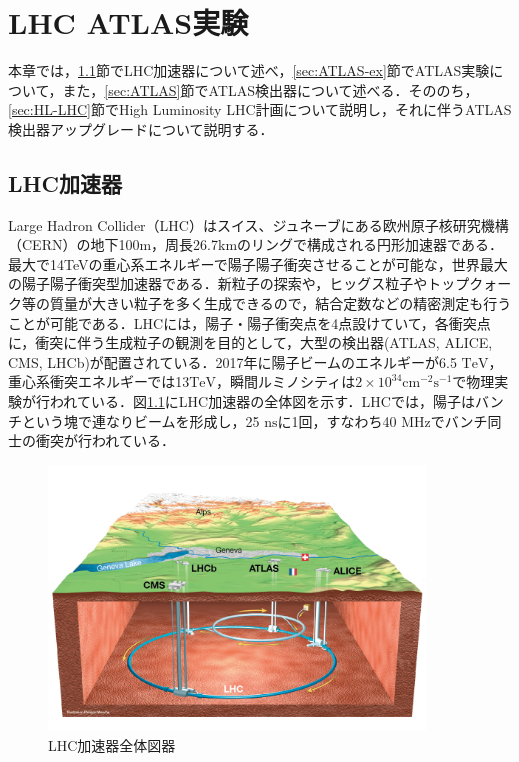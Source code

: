 \chapter{LHC ATLAS実験}
本章では，\ref{sec:LHC}節でLHC加速器について述べ，\ref{sec:ATLAS-ex}節でATLAS実験について，また，\ref{sec:ATLAS}節でATLAS検出器について述べる．そののち，\ref{sec:HL-LHC}節でHigh Luminosity LHC計画について説明し，それに伴うATLAS検出器アップグレードについて説明する．\par
\section{LHC加速器}
\label{sec:LHC}
Large Hadron Collider（LHC）はスイス、ジュネーブにある欧州原子核研究機構（CERN）の地下100m，周長26.7kmのリングで構成される円形加速器である．最大で14TeVの重心系エネルギーで陽子陽子衝突させることが可能な，世界最大の陽子陽子衝突型加速器である．新粒子の探索や，ヒッグス粒子やトップクォーク等の質量が大きい粒子を多く生成できるので，結合定数などの精密測定も行うことが可能である．LHCには，陽子・陽子衝突点を4点設けていて，各衝突点に，衝突に伴う生成粒子の観測を目的として，大型の検出器(ATLAS, ALICE, CMS, LHCb)が配置されている．2017年に陽子ビームのエネルギーが6.5 $\mathrm{TeV}$，重心系衝突エネルギーでは13$\mathrm{TeV}$，瞬間ルミノシティは$2\times 10^34 \mathrm{cm^{-2}s^{-1}}$で物理実験が行われている．図\ref{fig:LHC}にLHC加速器の全体図を示す．LHCでは，陽子はバンチという塊で連なりビームを形成し，25 $\mathrm{ns}$に1回，すなわち40 $\mathrm{MHz}$でバンチ同士の衝突が行われている．\par

\begin{figure}[h]
  \centering
  \includegraphics[width=10cm]{./figure/LHC.png}
  \caption{LHC加速器全体図器\cite{Collaboration_2008}}
  \label{fig:LHC}
\end{figure}


